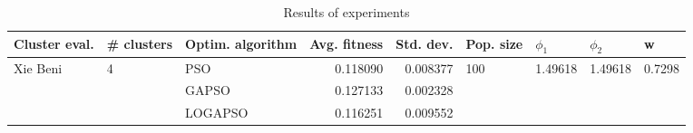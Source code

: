 \begin{table}
\centering
\caption{Results of experiments}
\begin{tabular}{lllrrllll}
\toprule
            Cluster eval. &        \# clusters & Optim. algorithm &  Avg. fitness &  Std. dev. &            Pop. size &               $\phi_{1}$ &               $\phi_{2}$ &                       w \\
\midrule
\multirow{3}{*}{Xie Beni} & \multirow{3}{*}{4} &              PSO &      0.118090 &   0.008377 & \multirow{3}{*}{100} & \multirow{3}{*}{1.49618} & \multirow{3}{*}{1.49618} & \multirow{3}{*}{0.7298} \\
                          &                    &            GAPSO &      0.127133 &   0.002328 &                      &                          &                          &                         \\
                          &                    &          LOGAPSO &      0.116251 &   0.009552 &                      &                          &                          &                         \\
\bottomrule
\end{tabular}
\end{table}

